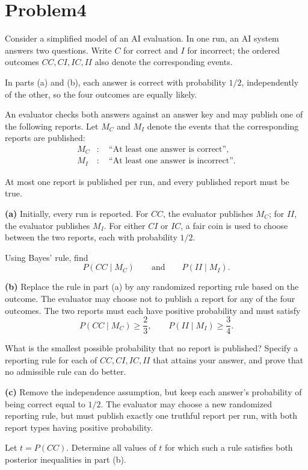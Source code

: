 \documentclass[11pt,a4paper]{article}
\begin{document}
\section*{Problem4}

Consider a simplified model of an AI evaluation. In one run,
an AI system answers two questions. Write $C$ for correct
and $I$ for incorrect; the ordered outcomes $CC,CI,IC,II$
also denote the corresponding events.

In parts (a) and (b), each answer is correct with probability
$1/2$, independently of the other, so the four outcomes
are equally likely.

An evaluator checks both answers against an answer key
and may publish one of the following reports.
Let $M_C$ and $M_I$ denote the events that the
corresponding reports are published:
\[
\begin{aligned}
M_C &: \quad \text{``At least one answer is correct''},\\
M_I &: \quad \text{``At least one answer is incorrect''}.
\end{aligned}
\]

At most one report is published per run, and every
published report must be true.

\textbf{(a)}
Initially, every run is reported. For $CC$, the evaluator
publishes $M_C$; for $II$, the evaluator publishes $M_I$.
For either $CI$ or $IC$, a fair coin is used to choose
between the two reports, each with probability $1/2$.

Using Bayes' rule, find
\[
P(CC\mid M_C)
\qquad\text{and}\qquad
P(II\mid M_I).
\]

\textbf{(b)}
Replace the rule in part (a) by any randomized reporting
rule based on the outcome. The evaluator may choose not
to publish a report for any of the four outcomes.
The two reports must each have positive probability
and must satisfy
\[
P(CC\mid M_C)\geq\frac23,
\qquad
P(II\mid M_I)\geq\frac34.
\]

What is the smallest possible probability that no report
is published? Specify a reporting rule for each of
$CC,CI,IC,II$ that attains your answer, and prove that
no admissible rule can do better.

\textbf{(c)}
Remove the independence assumption, but keep each
answer's probability of being correct equal to $1/2$.
The evaluator may choose a new randomized reporting
rule, but must publish exactly one truthful report
per run, with both report types having positive probability.

Let $t=P(CC)$. Determine all values of $t$ for which
such a rule satisfies both posterior inequalities
in part (b).
\end{document}
